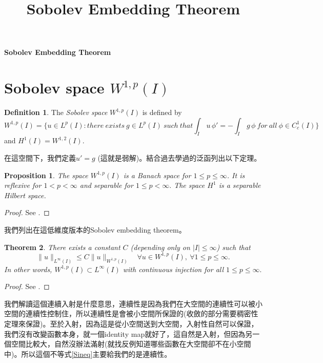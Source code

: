 \documentclass[14pt]{article}
\newtheorem{theorem}{Theorem}
\newtheorem{proposition}[theorem]{Proposition}
\theoremstyle{definition}
\newtheorem*{definition}{Definition}
\theoremstyle{remark}
\numberwithin{equation}{section}
\numberwithin{theorem}{section}
\begin{document}
\setcounter{section}{0}
\title{Sobolev Embedding Theorem}

\thispagestyle{empty}
\begin{center}
{\LARGE \bf Sobolev Embedding Theorem}
\end{center}
\section{Sobolev space $W^{1,p}(I)$}
\begin{definition} The \emph{Sobolev space} $W^{1,p}(I)$ is defined by
\begin{equation}\label{Sineq}
W^{1,p}(I)=\{u\in L^p(I): there\ exists\ g\in L^p(I)\ such\ that \int_I\,u\,\phi'=-\int_I\,g\,\phi\ for\ all\ \phi\in C^1_c(I)\}
\end{equation}
and $H^1(I)=W^{1,2}(I)$. 
\end{definition}
在這空間下，我們定義$u'=g$ (這就是弱解)。結合過去學過的泛函列出以下定理。

\begin{proposition} The space $W^{1,p}(I)$ is a Banach space for $1\leq p\leq\infty$. It is reflexive for $1<p<\infty$ and separable for $1\leq p<\infty.$ The space $H^1$ is a separable Hilbert space.
\end{proposition}
\begin{proof} 
See \cite[p.~203]{Bre10}.
\end{proof}
我們列出在這低維度版本的Sobolev embedding theorem。

\begin{theorem}\label{Sobolevembedding} There exists a constant $C$ (depending only on $\lvert I\rvert\leq\infty$) such that 
$$
\lVert u\rVert_{L^\infty(I)}\leq C\lVert u\rVert_{W^{1,p}(I)}\quad\forall u\in W^{1,p}(I),\ \forall 1\leq p\leq\infty.
$$
In other words, $W^{1,p}(I)\subset L^\infty(I)$ with continuous injection for all $1\leq p\leq\infty.$ 
\end{theorem}
\begin{proof} 
See \cite[p.~213]{Bre10}.
\end{proof}
我們解讀這個連續入射是什麼意思，連續性是因為我們在大空間的連續性可以被小空間的連續性控制住，所以連續性是會被小空間所保證的(收斂的部分需要稠密性定理來保證)。至於入射，因為這是從小空間送到大空間，入射性自然可以保證，我們沒有改變函數本身，就一個identity map就好了，這自然是入射，但因為另一個空間比較大，自然沒辦法滿射(就找反例知道哪些函數在大空間卻不在小空間中)。所以這個不等式\eqref{Sineq}主要給我們的是連續性。
\end{document}

